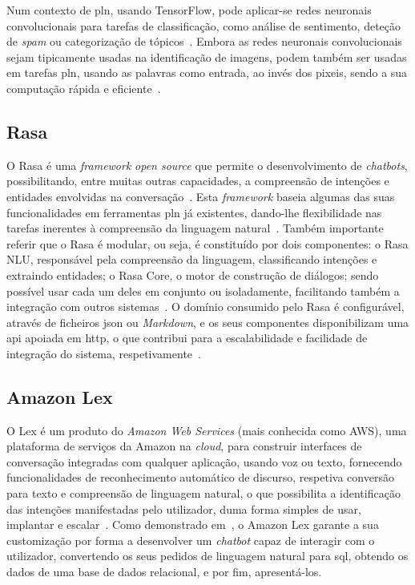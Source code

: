 Num contexto de \gls{pln}, usando TensorFlow, pode aplicar-se redes neuronais convolucionais para tarefas de classificação, como análise de sentimento, deteção de \textit{spam} ou categorização de tópicos~\parencite{understanding_convolution_neural_networks_nlp}. Embora as redes neuronais convolucionais sejam tipicamente usadas na identificação de imagens, podem também ser usadas em tarefas \gls{pln}, usando as palavras como entrada, ao invés dos pixeis, sendo a sua computação rápida e eficiente~\parencite{understanding_convolution_neural_networks_nlp}.

\subsection{Rasa}
O Rasa é uma \textit{framework} \textit{open source} que permite o desenvolvimento de \textit{chatbots}, possibilitando, entre muitas outras capacidades, a compreensão de intenções e entidades envolvidas na conversação~\parencite{rasa_official}. Esta \textit{framework} baseia algumas das suas funcionalidades em ferramentas \gls{pln} já existentes, dando-lhe flexibilidade nas tarefas inerentes à compreensão da linguagem natural~\parencite{rasa_open_source_language_understanding}. Também importante referir que o Rasa é modular, ou seja, é constituído por dois componentes: o Rasa NLU, responsável pela compreensão da linguagem, classificando intenções e extraindo entidades; o Rasa Core, o motor de construção de diálogos; sendo possível usar cada um deles em conjunto ou isoladamente, facilitando também a integração com outros sistemas~\parencite{rasa_open_source_language_understanding, rasa_official}. O domínio consumido pelo Rasa é configurável, através de ficheiros \gls{json} ou \textit{Markdown}, e os seus componentes disponibilizam uma \gls{api} apoiada em \gls{http}, o que contribui para a escalabilidade e facilidade de integração do sistema, respetivamente~\parencite{rasa_open_source_language_understanding}.

\subsection{Amazon Lex}
O Lex é um produto do \textit{Amazon Web Services} (mais conhecida como AWS), uma plataforma de serviços da Amazon na \textit{cloud}, para construir interfaces de conversação integradas com qualquer aplicação, usando voz ou texto, fornecendo funcionalidades de reconhecimento automático de discurso, respetiva conversão para texto e compreensão de linguagem natural, o que possibilita a identificação das intenções manifestadas pelo utilizador, duma forma simples de usar, implantar e escalar~\parencite{amazon_lex_official}. Como demonstrado em~\textcite{aws_ml_blog_conversational_business}, o Amazon Lex garante a sua customização por forma a desenvolver um \textit{chatbot} capaz de interagir com o utilizador, convertendo os seus pedidos de linguagem natural para \gls{sql}, obtendo os dados de uma base de dados relacional, e por fim, apresentá-los.

